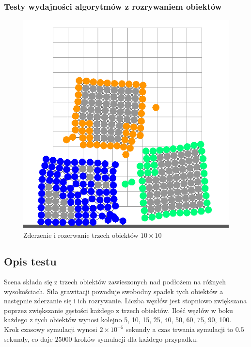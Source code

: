 \documentclass{beamer}
\begin{document}
\begin{frame}
    \frametitle{Testy wydajności algorytmów z rozrywaniem obiektów}
    \begin{figure}
        \includegraphics[width=0.9\linewidth]{app_boundary_performance_10x10_02.png} 
        \caption{Zderzenie i rozerwanie trzech obiektów $10\times10$}
    \end{figure}
    \subsection{Opis testu}
    Scena składa się z trzech obiektów zawieszonych nad podłożem na różnych wysokościach. Siła grawitacji 
    powoduje swobodny spadek tych obiektów a następnie zderzanie się i ich rozrywanie. Liczba węzłów jest
    stopniowo zwiększana poprzez zwiększanie gęstości każdego z trzech obiektów. Ilość węzłów w boku każdego 
    z tych obiektów wynosi kolejno 5, 10, 15, 25, 40, 50, 60, 75, 90, 100. \\
    
    Krok czasowy symulacji wynosi
    $2 \times 10^{-5}$ sekundy a czas trwania symulacji to $0.5$ sekundy, co 
    daje $25000$ kroków symulacji dla każdego przypadku. \\
\end{frame}
\end{document}
